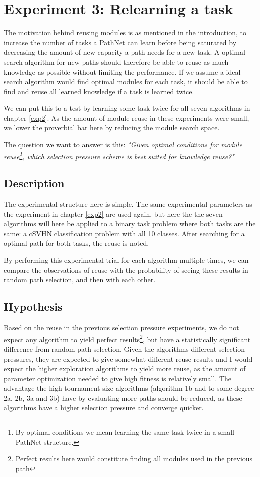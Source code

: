 \chapter{Experiment 3: Relearning a task}
\label{exp3}
The motivation behind reusing modules is as mentioned in the introduction, to increase the number of tasks a PathNet can learn before being saturated by decreasing the amount of new capacity a path needs for a new task. A optimal search algorithm for new paths should therefore be able to reuse as much knowledge as possible without limiting the performance. If we assume a ideal search algorithm would find optimal modules for each task, it should be able to find and reuse all learned knowledge if a task is learned twice. 

We can put this to a test by learning some task twice for all seven algorithms in chapter \ref{exp2}. As the amount of module reuse in these experiments were small, we lower the proverbial bar here by reducing the module search space.

The question we want to answer is this: \textit{"Given optimal conditions for module reuse\footnote{By optimal conditions we mean learning the same task twice in a small PathNet structure.}, which selection pressure scheme is best suited for knowledge reuse?"}

\section{Description}
The experimental structure here is simple. The same experimental parameters as the experiment in chapter \ref{exp2} are used again, but here the the seven algorithms will here be applied to a binary task problem where both tasks are the same: a cSVHN classification problem with all 10 classes. After searching for a optimal path for both tasks, the reuse is noted. 

By performing this experimental trial for each algorithm multiple times, we can compare the observations of reuse with the probability of seeing these results in random path selection, and then with each other. 

\section{Hypothesis}
Based on the reuse in the previous selection pressure experiments, we do not expect any algorithm to yield perfect results\footnote{Perfect results here would constitute finding all modules used in the previous path}, but have a statistically significant difference from random path selection. Given the algorithms different selection pressures, they are expected to give somewhat different reuse results and I would expect the higher exploration algorithms to yield more reuse, as the amount of parameter optimization needed to give high fitness is relatively small. The advantage the high tournament size algorithms (algorithm 1b and to some degree 2a, 2b, 3a and 3b) have by evaluating more paths should be reduced, as these algorithms have a higher selection pressure and converge quicker. 

